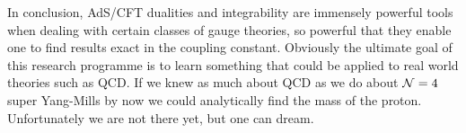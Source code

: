 
In conclusion, AdS/CFT dualities and integrability are immensely powerful tools when dealing with certain classes of gauge theories, so powerful that they enable one to find results exact in the coupling constant.
Obviously the ultimate goal of this research programme is to learn something that could be applied to real world theories such as QCD.
If we knew as much about QCD as we do about $\mathcal{N}=4$ super Yang-Mills by now we could analytically find the mass of the proton.
Unfortunately we are not there yet, but one can dream.




